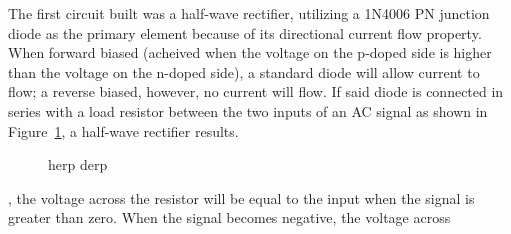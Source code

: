 The first circuit built was a half-wave rectifier, utilizing a 1N4006 PN junction diode as the primary element because of its directional current flow property.  When forward biased (acheived when the voltage on the p-doped side is higher than the voltage on the n-doped side), a standard diode will allow current to flow; a reverse biased, however, no current will flow.  If said diode is connected in series with a load resistor between the two inputs of an AC signal as shown in Figure~\ref{fig:schem1}, a half-wave rectifier results.
\begin{figure}[H]
	\centering
	
	\caption{herp derp}
	\label{fig:schem1}
\end{figure}
, the voltage across the resistor will be equal to the input when the signal is greater than zero.  When the signal becomes negative, the voltage across


\begin{figure}[H]

\end{figure}

\begin{figure}[H]

\end{figure}

\begin{figure}[H]

\end{figure}

